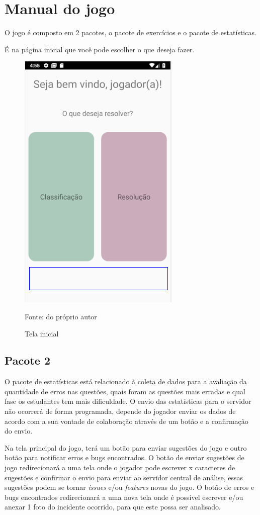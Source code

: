 \chapter[Manual do jogo]{Manual do jogo}
O jogo é composto em 2 pacotes, o pacote de exercícios e o pacote de estatísticas.

É na página inicial que você pode escolher o que deseja fazer.

\begin{figure}[H]
\centering
\caption{Tela inicial}
\includegraphics[scale=0.72]{figuras/tela_inicial.png}

\small{Fonte: do próprio autor}
\end{figure}



\section[Pacote 2]{Pacote 2}
O pacote de estatísticas está relacionado à coleta de dados para a avaliação da quantidade de erros nas questões, quais foram as questões mais erradas e qual fase os estudantes tem mais dificuldade. O envio das estatísticas para o servidor não ocorrerá de forma programada, depende do jogador enviar os dados de acordo com a sua vontade de colaboração através de um botão e a confirmação do envio.


Na tela principal do jogo, terá um botão para enviar sugestões do jogo e outro botão para notificar erros e bugs encontrados.
O botão de enviar sugestões de jogo redirecionará a uma tela onde o jogador pode escrever x caracteres de sugestões e confirmar o envio para enviar ao servidor central de análise, essas sugestões podem se tornar \textit{issues} e/ou \textit{features} novas do jogo.
O botão de erros e bugs encontrados redirecionará a uma nova tela onde é possível escrever e/ou anexar 1 foto do incidente ocorrido, para que este possa ser analisado.

